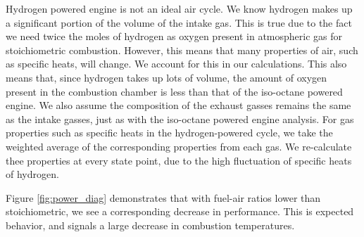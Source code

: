 \documentclass[conf]{new-aiaa}
\begin{document}
Hydrogen powered engine is not an ideal air cycle. We know hydrogen makes up a significant portion of the volume of the intake gas. This is true due to the fact we need twice the moles of hydrogen as oxygen present in atmospheric gas for stoichiometric combustion. However, this means that many properties of air, such as specific heats, will change. We account for this in our calculations. This also means that, since hydrogen takes up lots of volume, the amount of oxygen present in the combustion chamber is less than that of the iso-octane powered engine. We also assume the composition of the exhaust gasses remains the same as the intake gasses, just as with the iso-octane powered engine analysis. For gas properties such as specific heats in the hydrogen-powered cycle, we take the weighted average of the corresponding properties from each gas. We re-calculate thee properties at every state point, due to the high fluctuation of specific heats of hydrogen.

Figure \ref{fig:power_diag} demonstrates that with fuel-air ratios lower than stoichiometric, we see a corresponding decrease in performance. This is expected behavior, and signals a large decrease in combustion temperatures.
\end{document}
